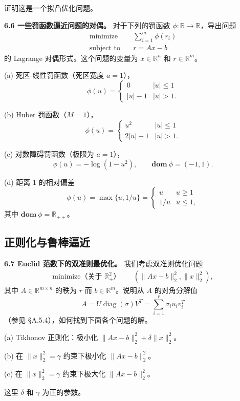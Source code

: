 \documentclass[UTF8,12pt,a4paper,fontset=fandol]{ctexart}
\begin{document}
证明这是一个拟凸优化问题。

\noindent\textbf{6.6 一些罚函数逼近问题的对偶。}\quad
对于下列的罚函数 $\phi:\mathbb{R}\to\mathbb{R}$，导出问题
\[
\begin{aligned}
\text{minimize}\quad & \sum_{i=1}^m \phi(r_i)\\
\text{subject to}\quad & r=Ax-b
\end{aligned}
\]
的 Lagrange 对偶形式。这个问题的变量为 $x\in\mathbb{R}^n$ 和 $r\in\mathbb{R}^m$。

(a) 死区-线性罚函数（死区宽度 $a=1$），
\[
\phi(u)=
\begin{cases}
0 & |u|\leq 1\\
|u|-1 & |u|>1.
\end{cases}
\]

(b) Huber 罚函数（$M=1$），
\[
\phi(u)=
\begin{cases}
u^2 & |u|\leq 1\\
2|u|-1 & |u|>1.
\end{cases}
\]

(c) 对数障碍罚函数（极限为 $a=1$），
\[
\phi(u)=-\log(1-u^2),\qquad \mathbf{dom}\ \phi=(-1,1).
\]

(d) 距离 1 的相对偏差
\[
\phi(u)=\max\{u,1/u\}=
\begin{cases}
u & u\geq 1\\
1/u & u\leq 1,
\end{cases}
\]
其中 $\mathbf{dom}\ \phi=\mathbb{R}_{++}$。

\subsection*{正则化与鲁棒逼近}

\noindent\textbf{6.7 Euclid 范数下的双准则最优化。}\quad
我们考虑双准则优化问题
\[
\begin{aligned}
\text{minimize（关于 $\mathbb{R}_+^2$）}\quad & (\|Ax-b\|_2^2,\|x\|_2^2),
\end{aligned}
\]
其中 $A\in\mathbb{R}^{m\times n}$ 的秩为 $r$ 而 $b\in\mathbb{R}^m$。说明从 $A$ 的对角分解值
\[
A=U\operatorname{diag}(\sigma)V^T=\sum_{i=1}^r\sigma_i u_i v_i^T
\]
（参见 \S A.5.4），如何找到下面各个问题的解。

(a) Tikhonov 正则化：极小化 $\|Ax-b\|_2^2+\delta\|x\|_2^2$。

(b) 在 $\|x\|_2^2=\gamma$ 约束下极小化 $\|Ax-b\|_2^2$。

(c) 在 $\|x\|_2^2=\gamma$ 约束下极大化 $\|Ax-b\|_2^2$。

这里 $\delta$ 和 $\gamma$ 为正的参数。
\end{document}
